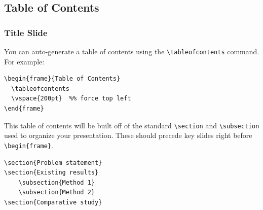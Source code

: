 \documentclass[t]{beamer}
\begin{document}
\subsection{Table of Contents}
\begin{frame}[fragile=singleslide]
  \frametitle{Title Slide}

  You can auto-generate a table of contents using the \verb|\tableofcontents|
  command. For example:

  \begin{lstlisting}[basicstyle=\footnotesize\ttfamily]
\begin{frame}{Table of Contents}
  \tableofcontents
  \vspace{200pt}  %% force top left  
\end{frame}
  \end{lstlisting}

  This table of contents will be built off of the standard \verb|\section| and
  \verb|\subsection| used to organize your presentation. These should precede
  key slides right before \verb|\begin{frame}|.

  \begin{lstlisting}[basicstyle=\footnotesize\ttfamily]
\section{Problem statement}
\section{Existing results}
    \subsection{Method 1}
    \subsection{Method 2}
\section{Comparative study}
  \end{lstlisting}

\end{frame}
\end{document}
